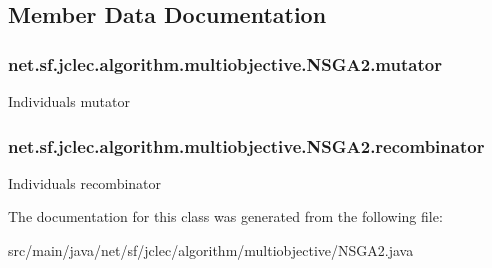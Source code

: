 \subsection{Member Data Documentation}
\hypertarget{classnet_1_1sf_1_1jclec_1_1algorithm_1_1multiobjective_1_1_n_s_g_a2_a1823d623a933ef194564311b162e7fbd}{
\subsubsection[{mutator}]{ net.\-sf.\-jclec.\-algorithm.\-multiobjective.\-N\-S\-G\-A2.\-mutator\hspace{0.3cm}{\ttfamily [protected]}}}\label{classnet_1_1sf_1_1jclec_1_1algorithm_1_1multiobjective_1_1_n_s_g_a2_a1823d623a933ef194564311b162e7fbd}
Individuals mutator \hypertarget{classnet_1_1sf_1_1jclec_1_1algorithm_1_1multiobjective_1_1_n_s_g_a2_a54d8a587946b6b3f1c11a348a25d85a9}{
\subsubsection[{recombinator}]{ net.\-sf.\-jclec.\-algorithm.\-multiobjective.\-N\-S\-G\-A2.\-recombinator\hspace{0.3cm}{\ttfamily [protected]}}}\label{classnet_1_1sf_1_1jclec_1_1algorithm_1_1multiobjective_1_1_n_s_g_a2_a54d8a587946b6b3f1c11a348a25d85a9}
Individuals recombinator 

The documentation for this class was generated from the following file\-:\begin{DoxyCompactItemize}
\item 
src/main/java/net/sf/jclec/algorithm/multiobjective/N\-S\-G\-A2.\-java\end{DoxyCompactItemize}
